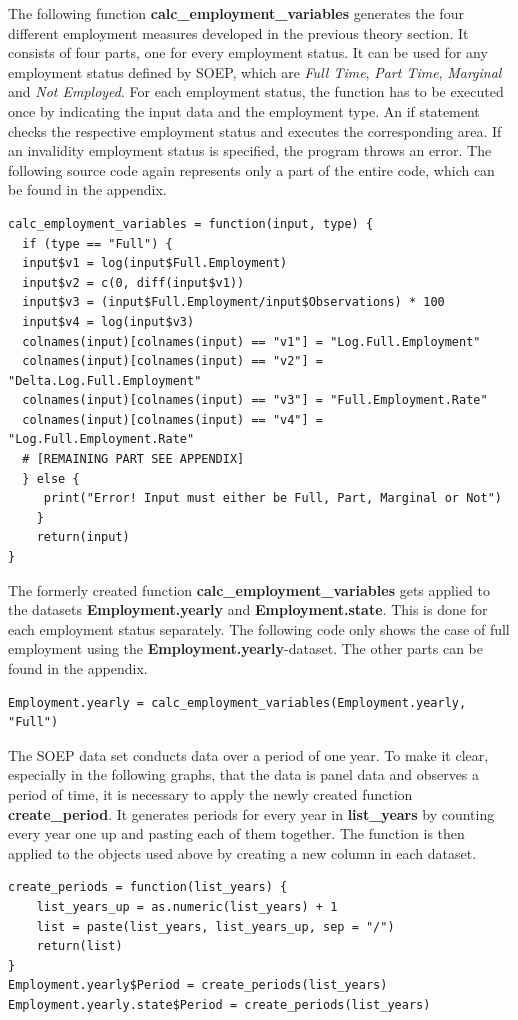 \documentclass[a4paper]{article}
\begin{document}
The following function \textbf{calc\_employment\_variables} generates the four different employment measures developed in the previous theory section. It consists of four parts, one for every employment status. It can be used for any employment status defined by SOEP, which are \textit{Full Time}, \textit{Part Time}, \textit{Marginal} and \textit{Not Employed}. For each employment status, the function has to be executed once by indicating the input data and the employment type. An if statement checks the respective employment status and executes the corresponding area. If an invalidity employment status is specified, the program throws an error. The following source code again represents only a part of the entire code, which can be found in the appendix.
\begin{lstlisting}
calc_employment_variables = function(input, type) {
  if (type == "Full") {
  input$v1 = log(input$Full.Employment)
  input$v2 = c(0, diff(input$v1))
  input$v3 = (input$Full.Employment/input$Observations) * 100
  input$v4 = log(input$v3)
  colnames(input)[colnames(input) == "v1"] = "Log.Full.Employment"
  colnames(input)[colnames(input) == "v2"] = "Delta.Log.Full.Employment"
  colnames(input)[colnames(input) == "v3"] = "Full.Employment.Rate"
  colnames(input)[colnames(input) == "v4"] = "Log.Full.Employment.Rate"
  # [REMAINING PART SEE APPENDIX]
  } else {
     print("Error! Input must either be Full, Part, Marginal or Not")
    }
    return(input)
}
\end{lstlisting}

The formerly created function \textbf{calc\_employment\_variables} gets applied to the datasets \textbf{Employment.yearly} and \textbf{Employment.state}. This is done for each employment status separately. The following code only shows the case of full employment using the \textbf{Employment.yearly}-dataset. The other parts can be found in the appendix.
\begin{lstlisting}
Employment.yearly = calc_employment_variables(Employment.yearly, "Full")
\end{lstlisting}

The SOEP data set conducts data over a period of one year. To make it clear, especially in the following graphs, that the data is panel data and observes a period of time, it is necessary to apply the newly created function \textbf{create\_period}. It generates periods for every year in \textbf{list\_years} by counting every year one up and pasting each of them together. The function is then applied to the objects used above by creating a new column in each dataset.
\begin{lstlisting}
create_periods = function(list_years) {
    list_years_up = as.numeric(list_years) + 1
    list = paste(list_years, list_years_up, sep = "/")
    return(list)
}
Employment.yearly$Period = create_periods(list_years)
Employment.yearly.state$Period = create_periods(list_years)
\end{lstlisting}
%
\end{document}
